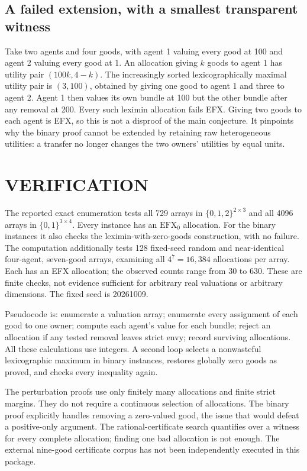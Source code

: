 \documentclass[11pt,a4paper]{article}
\theoremstyle{definition}
\theoremstyle{remark}
\begin{document}
\subsection{A failed extension, with a smallest transparent witness}
Take two agents and four goods, with agent 1 valuing every good at 100 and agent 2 valuing every good at 1. An allocation giving $k$ goods to agent 1 has utility pair $(100k,4-k)$. The increasingly sorted lexicographically maximal utility pair is $(3,100)$, obtained by giving one good to agent 1 and three to agent 2. Agent 1 then values its own bundle at 100 but the other bundle after any removal at 200. Every such leximin allocation fails EFX. Giving two goods to each agent is EFX, so this is not a disproof of the main conjecture. It pinpoints why the binary proof cannot be extended by retaining raw heterogeneous utilities: a transfer no longer changes the two owners' utilities by equal units.

\section{VERIFICATION}
The reported exact enumeration tests all 729 arrays in $\{0,1,2\}^{2\times3}$ and all 4096 arrays in $\{0,1\}^{3\times4}$. Every instance has an $\mathrm{EFX}_0$ allocation. For the binary instances it also checks the leximin-with-zero-goods construction, with no failure. The computation additionally tests 128 fixed-seed random and near-identical four-agent, seven-good arrays, examining all $4^7=16{,}384$ allocations per array. Each has an EFX allocation; the observed counts range from 30 to 630. These are finite checks, not evidence sufficient for arbitrary real valuations or arbitrary dimensions. The fixed seed is 20261009.

Pseudocode is: enumerate a valuation array; enumerate every assignment of each good to one owner; compute each agent's value for each bundle; reject an allocation if any tested removal leaves strict envy; record surviving allocations. All these calculations use integers. A second loop selects a nonwasteful lexicographic maximum in binary instances, restores globally zero goods as proved, and checks every inequality again.

The perturbation proofs use only finitely many allocations and finite strict margins. They do not require a continuous selection of allocations. The binary proof explicitly handles removing a zero-valued good, the issue that would defeat a positive-only argument. The rational-certificate search quantifies over a witness for every complete allocation; finding one bad allocation is not enough. The external nine-good certificate corpus has not been independently executed in this package.
\end{document}
